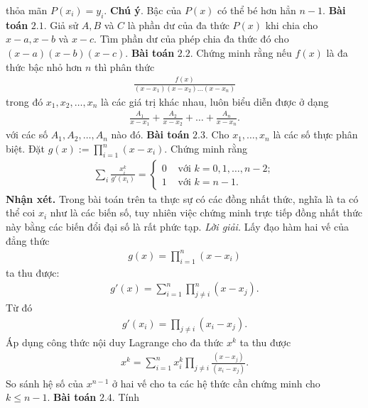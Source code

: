 \begin{multicols}{2}
	thỏa mãn $P(x_i)=y_i$.
	\vskip 0.1cm
	\textbf{\color{hoccungpi}Chú ý}. Bậc của $P(x)$  có thể bé hơn hẳn $n-1$.
	\vskip 0.1cm
	\textbf{\color{hoccungpi}Bài toán} $\pmb{2.1.}$ Giả sử $A, B$ và $C$ là phần dư của đa thức $P(x)$ khi chia cho $x-a,x-b$ và $x-c$.
		Tìm phần dư của phép chia đa thức đó cho $(x-a)(x-b)(x-c).$
	\vskip 0.1cm
	\textbf{\color{hoccungpi}Bài toán} $\pmb{2.2.}$ Chứng minh rằng nếu $f(x)$ là đa thức bậc nhỏ
		hơn $n$ thì phân thức
		\begin{align*}
			\frac{f(x)}{(x-x_1)(x-x_2)\ldots (x-x_n)}
		\end{align*}
		trong đó $x_1, x_2, \ldots, x_n$ là các giá trị khác nhau, 
		luôn biểu diễn được ở dạng
		\begin{align*}
			\frac{A_1}{x-x_1}+\frac{A_2}{x-x_2}+\ldots +\frac{A_n}{x-x_n}.
		\end{align*}
		với các số $  A_1, A_2,\ldots, A_n$ nào đó.
	\vskip 0.1cm
	\textbf{\color{hoccungpi}Bài toán} $\pmb{2.3.}$ Cho $x_1,\ldots,x_n$ là các số thực phân biệt. Đặt  $g(x):=\prod_{i=1}^n(x-x_i)$. Chứng minh rằng
	\begin{align*}
		\sum_i\frac{x_i^k}{g'(x_i)}= \begin{cases}
			0&\text{ với } k=0,1,\ldots,n-2;\\
			1& \text{ với } k=n-1.
		\end{cases}
	\end{align*}
	\textbf{\color{hoccungpi}Nhận xét.} Trong bài toán trên ta thực sự có các đồng nhất thức, nghĩa là ta có thể coi $x_i$ như là các biến số, tuy nhiên việc chứng minh trực tiếp đồng nhất thức này bằng các biến đổi đại số là rất phức tạp.  
	\vskip 0.1cm
	\textit{Lời giải.} 
	Lấy đạo hàm hai vế của đẳng thức 
	\begin{align*}
			g(x)=\prod_{i=1}^n(x-x_i)  \tag{$2$}
	\end{align*}
	ta thu được:
	\begin{align*}
		g'(x)=\sum_{i=1}^n\prod_{j\neq i}^n(x-x_j).
	\end{align*}  
	Từ đó
	\begin{align*}
		g'(x_i)=\prod_{j\neq i}(x_i-x_j). \tag{$3$}
	\end{align*}
	Áp dụng công thức nội duy Lagrange cho  đa thức $x^k$ ta thu được
	\begin{align*}
		x^k= \sum_{i=1}^nx_i^k\prod_{j\neq i}\frac{(x-x_j)}{ (x_i-x_j)}.
	\end{align*}
	So sánh hệ số của $x^{n-1}$ ở hai vế cho ta các hệ thức cần chứng minh cho $k\leq n-1$.
	\vskip 0.1cm
	\textbf{\color{hoccungpi}Bài toán} $\pmb{2.4.}$ Tính 

\end{multicols}
